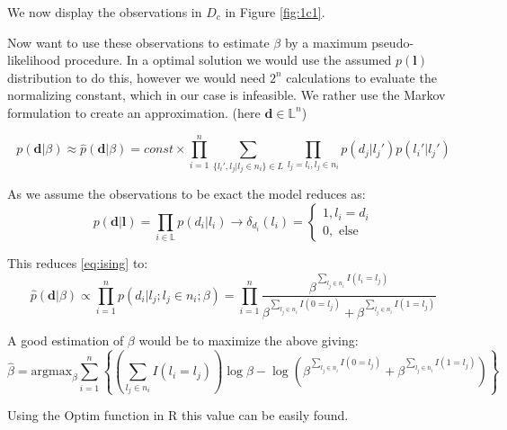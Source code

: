 \documentclass{article}
\newcommand{\vect}[1]{\ensuremath{\boldsymbol{\mathbf{#1}}}}
\begin{document}
	We now display the observations in $D_c$ in Figure \ref{fig:1c1}.
	
	Now want to use these observations to estimate $\beta$ by a maximum pseudo-likelihood procedure. In a optimal solution we would use the assumed $p(\vect l)$ distribution to do this, however we would need $2^n$ calculations to evaluate the normalizing constant, which in our case is infeasible. We rather use the Markov formulation to create an approximation.  (here $\vect d \in \mathbb{L}^n$)
	
	\begin{equation} \label{eq:ising}
		p(\vect d | \beta ) \approx \hat p(\vect d | \beta) = const \times \prod_{i = 1}^{n}\sum_{\lbrace l_i', l_j | l_j \in n_i \rbrace \in L }  \prod_{l_j = l_i, l_j \in n_i}p(d_j | l_j')p(l_i'|l_j')
	\end{equation}
	

	
	As we assume the observations to be exact the model reduces as:
	\begin{equation}
		p(\vect d | \vect l) = \prod_{i \in \mathbb{L}}p(d_i | l_i) \rightarrow \delta_{d_i}(l_i) = \begin{cases}
		1, l_i = d_i \\ 
		0, \text{ else}
		\end{cases}
	\end{equation} 
	
	This reduces \eqref{eq:ising} to: 
	\begin{equation}
		\hat p(\vect d | \beta) \propto \prod_{i = 1}^n p(d_i|l_j; l_j \in n_i; \beta) = \prod_{i=1}^{n}\dfrac{\beta^{\sum_{l_j \in n_i}I(l_i = l_j)}}{\beta^{\sum_{l_j \in n_i}I(0 = l_j)} + \beta^{\sum_{l_j \in n_i}I(1 = l_j)}}
	\end{equation}
	
	A good estimation of $\beta$ would be to maximize the above giving:
	\begin{equation}
		\hat \beta = \text{argmax}_\beta \sum_{i=1}^{n} \left\{ \left( \sum_{l_j \in n_i}I(l_i = l_j)\right)\log\beta - \log\left(\beta^{\sum_{l_j \in n_i}I(0 = l_j)} + \beta^{\sum_{l_j \in n_i}I(1 = l_j)}\right) \right\}
	\end{equation}
	
	Using the Optim function in R this value can be easily found. 
\end{document}
